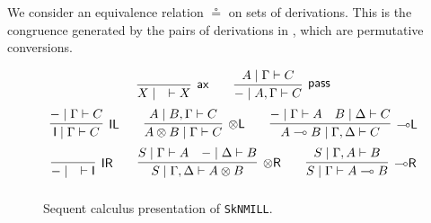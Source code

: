 \documentclass[runningheads]{llncs}
\newcommand{\tl}{\otimes \mathsf{L}}
\newcommand{\tr}{\otimes \mathsf{R}}
\newcommand{\lright}{{\multimap}\mathsf{R}}
\newcommand{\lleft}{{\multimap}\mathsf{L}}
\newcommand{\pass}{\mathsf{pass}}
\newcommand{\unitl}{\mathsf{IL}}
\newcommand{\unitr}{\mathsf{IR}}
\newcommand{\otR}{\tr}
\newcommand{\lolliR}{\lright}
\newcommand{\lolliL}{\lleft}
\newcommand{\ax}{\mathsf{ax}}
\newcommand{\ot}{\otimes}
\newcommand{\lolli}{\multimap}
\newcommand{\I}{\mathsf{I}}
\newcommand{\SkNMILL}{\texttt{SkNMILL}}
\begin{document}
We consider an equivalence relation $\circeq$ on sets of derivations. This is the congruence generated by the pairs of derivations in , which are permutative conversions. %
\begin{figure}[t]
  \[
  \def\arraystretch{2.5}
  \begin{array}{c}
    \infer[\ax]{X \mid \quad \vdash X}{}
    \qquad
    \infer[\pass]{- \mid A , \Gamma \vdash C}{A \mid \Gamma \vdash C}
    \\
    \infer[\unitl]{\I \mid \Gamma \vdash C}{- \mid \Gamma \vdash C}
    \qquad
    \infer[\tl]{A \ot B \mid \Gamma \vdash C}{A \mid B , \Gamma \vdash C}
    \qquad
    \infer[\lleft]{A \lolli B \mid \Gamma , \Delta \vdash C}{
      - \mid \Gamma \vdash A
      &
      B \mid \Delta \vdash C
    }
    \\
    \infer[\unitr]{- \mid \quad \vdash \I}{}
    \qquad
    \infer[\tr]{S \mid \Gamma , \Delta \vdash A \ot B}{
      S \mid \Gamma \vdash A
      &
      - \mid \Delta \vdash B
    }
    \qquad
    \infer[\lolliR]{S \mid \Gamma \vdash A \lolli B}{S \mid \Gamma , A \vdash B}
  \end{array}
  \]
\caption{Sequent calculus presentation of \SkNMILL.}
\label{fig:seqcalc}  
\end{figure}
\end{document}

